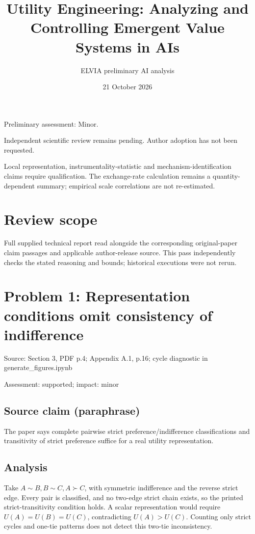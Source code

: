 \documentclass[11pt]{article}
\begin{document}
\title{Utility Engineering: Analyzing and Controlling Emergent Value Systems in AIs}

\author{ELVIA preliminary AI analysis}\date{21 October 2026}\maketitle

Preliminary assessment: Minor.\par

Independent scientific review remains pending. Author adoption has not been requested.

Local representation, instrumentality-statistic and mechanism-identification claims require qualification. The exchange-rate calculation remains a quantity-dependent summary; empirical scale correlations are not re-estimated.

\section*{Review scope}

Full supplied technical report read alongside the corresponding original-paper claim passages and applicable author-release source. This pass independently checks the stated reasoning and bounds; historical executions were not rerun.

\section*{Problem 1: Representation conditions omit consistency of indifference}

Source: Section 3, PDF p.4; Appendix A.1, p.16; cycle diagnostic in generate\_figures.ipynb

Assessment: supported; impact: minor

\subsection*{Source claim (paraphrase)}

The paper says complete pairwise strict preference/indifference classifications and transitivity of strict preference suffice for a real utility representation.

\subsection*{Analysis}

Take \(A\sim B,B\sim C,A\succ C\), with symmetric indifference and the reverse strict edge. Every pair is classified, and no two-edge strict chain exists, so the printed strict-transitivity condition holds. A scalar representation would require \(U(A)=U(B)=U(C)\), contradicting \(U(A)>U(C)\). Counting only strict cycles and one-tie patterns does not detect this two-tie inconsistency.
\end{document}
